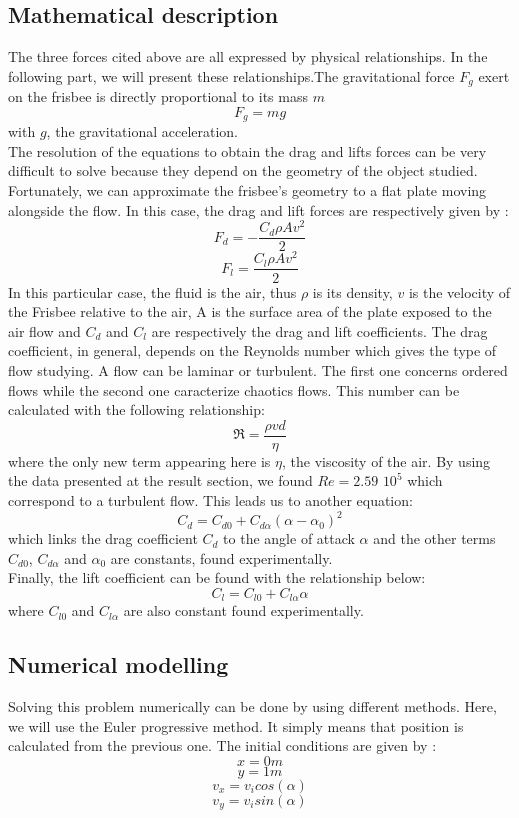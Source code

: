 \documentclass[10pt,a4paper]{report}
\begin{document}
\subsection{Mathematical description}
The three forces cited above are all expressed by physical relationships. In the following part, we will present these relationships.The gravitational force $F_g$ exert on the frisbee is directly proportional to its mass $m$
\[F_g = m g\]
with $g$, the gravitational acceleration.
\\
The resolution of the equations to obtain the drag and lifts forces can be very difficult to solve because they depend on the geometry of the object studied. Fortunately, we can approximate the frisbee's geometry to a flat plate moving alongside the flow. In this case, the drag and lift forces are respectively given by :
\[F_d = -\frac{C_d \rho A  v^2}{2}\]
\[F_l = \frac{C_l \rho A  v^2}{2}\]
In this particular case, the fluid is the air, thus $\rho$ is its density, $v$ is the velocity of the Frisbee relative to the air, A is the surface area of the plate exposed to the air flow and $C_d$ and $C_l$ are respectively the drag and lift coefficients.
The drag coefficient, in general, depends on the Reynolds number which gives the type of flow studying. A flow can be laminar or turbulent. The first one concerns ordered flows while the second one caracterize chaotics flows. This number can be calculated with the following relationship:
\[\Re = \frac{\rho v d}{\eta}\]
where the only new term appearing here is $\eta$, the viscosity of the air.
By using the data presented at the result section, we found $Re=2.59$ $10^5$ which correspond to a turbulent flow.
This leads us to another equation:
\[C_d = C_{d0} + C_{d\alpha}(\alpha-\alpha_0)^2\]
which links the drag coefficient $C_d$ to the angle of attack $\alpha$ and the other terms $C_{d0}$, $C_{d\alpha}$ and $\alpha_0$ are constants, found experimentally.
\\Finally, the lift coefficient can be found with the relationship below:
\[C_l = C_{l0} + C_{l \alpha} \alpha\]
where $C_{l0}$ and $C_{l\alpha}$ are also constant found experimentally.
\subsection{Numerical modelling}
Solving this problem numerically can be done by using different methods. Here, we will use the Euler progressive method. It simply means that position is calculated from the previous one.
The initial conditions are given by :
\[x = 0 m\]
\[y = 1 m\]
\[v_x = v_i cos(\alpha) \]
\[v_y = v_i sin(\alpha) \] 
\end{document}
